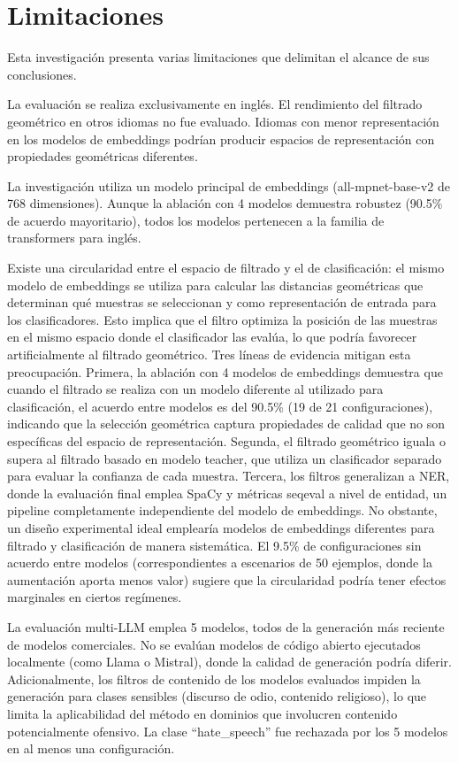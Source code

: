 \section{Limitaciones}
\label{sec:limitaciones}

Esta investigación presenta varias limitaciones que delimitan el alcance de sus conclusiones.

La evaluación se realiza exclusivamente en inglés. El rendimiento del filtrado geométrico en otros idiomas no fue evaluado. Idiomas con menor representación en los modelos de embeddings podrían producir espacios de representación con propiedades geométricas diferentes.

La investigación utiliza un modelo principal de embeddings (all-mpnet-base-v2 de 768 dimensiones). Aunque la ablación con 4 modelos demuestra robustez (90.5\% de acuerdo mayoritario), todos los modelos pertenecen a la familia de transformers para inglés.

Existe una circularidad entre el espacio de filtrado y el de clasificación: el mismo modelo de embeddings se utiliza para calcular las distancias geométricas que determinan qué muestras se seleccionan y como representación de entrada para los clasificadores. Esto implica que el filtro optimiza la posición de las muestras en el mismo espacio donde el clasificador las evalúa, lo que podría favorecer artificialmente al filtrado geométrico. Tres líneas de evidencia mitigan esta preocupación. Primera, la ablación con 4 modelos de embeddings demuestra que cuando el filtrado se realiza con un modelo diferente al utilizado para clasificación, el acuerdo entre modelos es del 90.5\% (19 de 21 configuraciones), indicando que la selección geométrica captura propiedades de calidad que no son específicas del espacio de representación. Segunda, el filtrado geométrico iguala o supera al filtrado basado en modelo teacher, que utiliza un clasificador separado para evaluar la confianza de cada muestra. Tercera, los filtros generalizan a NER, donde la evaluación final emplea SpaCy y métricas seqeval a nivel de entidad, un pipeline completamente independiente del modelo de embeddings. No obstante, un diseño experimental ideal emplearía modelos de embeddings diferentes para filtrado y clasificación de manera sistemática. El 9.5\% de configuraciones sin acuerdo entre modelos (correspondientes a escenarios de 50 ejemplos, donde la aumentación aporta menos valor) sugiere que la circularidad podría tener efectos marginales en ciertos regímenes.

La evaluación multi-LLM emplea 5 modelos, todos de la generación más reciente de modelos comerciales. No se evalúan modelos de código abierto ejecutados localmente (como Llama o Mistral), donde la calidad de generación podría diferir. Adicionalmente, los filtros de contenido de los modelos evaluados impiden la generación para clases sensibles (discurso de odio, contenido religioso), lo que limita la aplicabilidad del método en dominios que involucren contenido potencialmente ofensivo. La clase ``hate\_speech'' fue rechazada por los 5 modelos en al menos una configuración.

